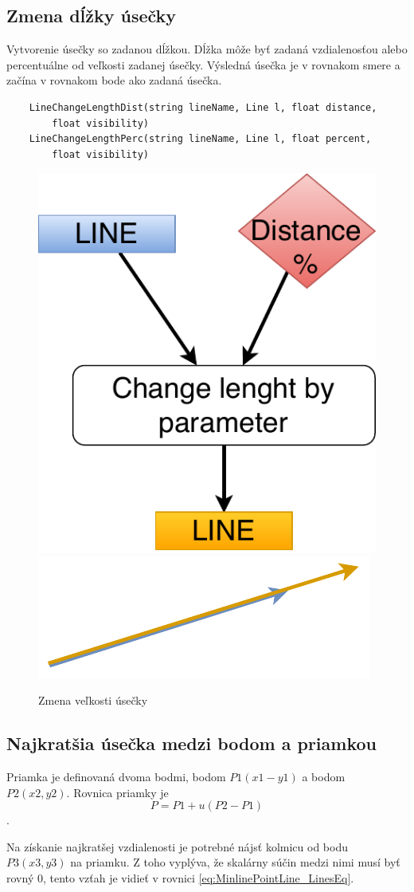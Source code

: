 \subsection{Zmena dĺžky úsečky}
Vytvorenie úsečky so zadanou dĺžkou. Dĺžka môže byť zadaná vzdialenosťou alebo percentuálne od veľkosti zadanej úsečky. Výsledná úsečka je v rovnakom smere a začína v rovnakom bode ako zadaná úsečka.
\begin{lstlisting}
	LineChangeLengthDist(string lineName, Line l, float distance, 
	    float visibility)
	LineChangeLengthPerc(string lineName, Line l, float percent, 
	    float visibility) 
\end{lstlisting}%

\begin{figure}[H]
	\centering
	\includegraphics[height=0.3\textwidth]{obrazky-figures/Diagram/Line/DP Navrh operacii-1D - LineChangeLength.pdf}
	\includegraphics[]{obrazky-figures/Diagram/Draw/2Line/DP Navrh operacii-1D - LineChangeLength.pdf}
	\caption{Zmena veľkosti úsečky}
	\label{fig:1}
\end{figure}

\subsection{Najkratšia úsečka medzi bodom a priamkou}\label{sec:najkratsiauseckaBP}
Priamka je definovaná dvoma bodmi, bodom $P1(x1-y1)$ a bodom $P2(x2,y2)$. 
Rovnica priamky je 
\begin{equation}
    P = P1 + u(P2-P1)
    \label{eq:MinlinePointLine_LineEq}
\end{equation}. 

Na získanie najkratšej vzdialenosti je potrebné nájsť kolmicu od bodu $P3(x3,y3)$ na priamku. Z toho vyplýva, že skalárny súčin medzi nimi musí byť rovný 0, tento vzťah je vidieť v rovnici \ref{eq:MinlinePointLine_LinesEq}.

